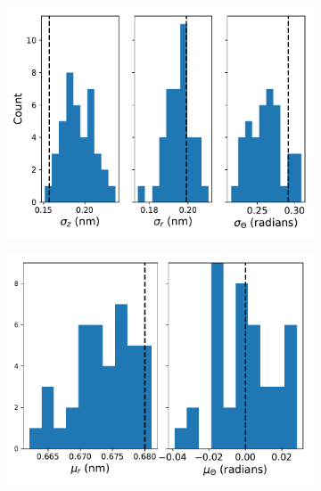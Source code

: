 \documentclass{article}
\begin{document}
  \begin{figure}[!htb]
  \centering
  \begin{subfigure}{0.49\textwidth}
  \includegraphics[width=\textwidth]{sandwiched_ensemble_stds.pdf}
  \caption{}\label{fig:offset_ensemble_stds}
  \end{subfigure}
  \begin{subfigure}{0.49\textwidth}
  \includegraphics[width=\textwidth]{sandwiched_ensemble_means.pdf}
  \caption{}\label{fig:offset_ensemble_means}
  \end{subfigure}
  \begin{subfigure}{\textwidth}

\end{subfigure}
\end{figure}
\end{document}
